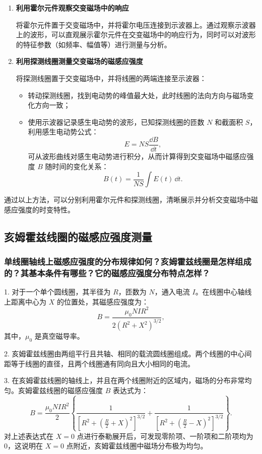 \documentclass[UTF-8,twoside,cs4size]{ctexart}
\begin{document}
\begin{enumerate}
    \item \textbf{利用霍尔元件观察交变磁场中的响应} \par
    将霍尔元件置于交变磁场中，并将霍尔电压连接到示波器上。通过观察示波器上的波形，可以直观展示霍尔元件在交变磁场中的响应行为，同时可以对波形的特征参数（如频率、幅值等）进行测量与分析。 \par

    \item \textbf{利用探测线圈测量交变磁场的磁感应强度} \par
    将探测线圈置于交变磁场中，并将线圈的两端连接至示波器：
    \begin{itemize}
        \item 转动探测线圈，找到电动势的峰值最大处，此时线圈的法向方向与磁场变化方向一致；
        \item 使用示波器记录感生电动势的波形，已知探测线圈的匝数 $N$ 和截面积 $S$，利用感生电动势公式：
        \[
        E = N S \frac{\dd B}{\dd t},
        \]
        可从波形曲线对感生电动势进行积分，从而计算得到交变磁场中磁感应强度 $B$ 随时间的变化关系：
        \[
        B(t) = \frac{1}{N S} \int E(t) \, \dd t.
        \]
    \end{itemize}
\end{enumerate}

通过以上方法，可以分别利用霍尔元件和探测线圈，清晰展示并分析交变磁场中磁感应强度的时变特性。

\subsection{亥姆霍兹线圈的磁感应强度测量}
\subsubsection{单线圈轴线上磁感应强度的分布规律如何？亥姆霍兹线圈是怎样组成的？其基本条件有哪些？它的磁感应强度分布特点怎样？}
1. 对于一个单个圆线圈，其半径为 $R$，匝数为 $N$，通入电流 $I$。在线圈中心轴线上距离中心为 $X$ 的位置处，其磁感应强度为：
\[
B = \frac{{\mu_0 N I R^2}}{{2 (R^2 + X^2)^{3/2}}},
\]
其中，$\mu_0$ 是真空磁导率。 \par

2. 亥姆霍兹线圈由两组平行且共轴、相同的载流圆线圈组成。两个线圈的中心间距等于线圈的直径，且两个线圈通有同向且大小相同的电流。 \par

3. 在亥姆霍兹线圈的轴线上，并且在两个线圈附近的区域内，磁场的分布非常均匀。亥姆霍兹线圈的磁感应强度 $B$ 表达式为：
\[
B = \frac{{\mu_0 N I R^2}}{2} \left\{
\frac{1}{{\left[R^2 + \left(\frac{R}{2} + X\right)^2\right]^{3/2}}} + 
\frac{1}{{\left[R^2 + \left(\frac{R}{2} - X\right)^2\right]^{3/2}}}
\right\}.
\]
对上述表达式在 $X = 0$ 点进行泰勒展开后，可发现零阶项、一阶项和二阶项均为 0，这说明在 $X = 0$ 点附近，亥姆霍兹线圈中磁场分布极为均匀。 \par
\end{document}

